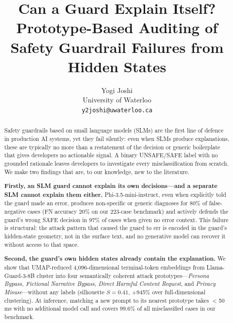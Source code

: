 \documentclass[letterpaper]{article}
\title{\large\textbf{Can a Guard Explain Itself?\\
Prototype-Based Auditing of Safety Guardrail Failures from Hidden States}}
\author{Yogi Joshi\\
  University of Waterloo\\
  \texttt{y2joshi@uwaterloo.ca}
}
\begin{document}
\maketitle

\begin{abstract}
Safety guardrails based on small language models (SLMs) are the first line of defence
in production AI systems, yet they fail silently: even when SLMs produce explanations,
these are typically no more than a restatement of the decision or generic boilerplate
that gives developers no actionable signal. A binary UNSAFE/SAFE label with no
grounded rationale leaves developers to investigate every misclassification from scratch.
We make two findings that are, to our knowledge, new to the literature.

\textbf{Firstly, an SLM guard cannot explain its own decisions---and a separate SLM
cannot explain them either.} Phi-3.5-mini-instruct, even when explicitly told the
guard made an error, produces non-specific or generic diagnoses for 80\% of
false-negative cases (FN accuracy 20\% on our 223-case benchmark)
and actively defends the guard's wrong SAFE decision in 97\% of cases when given no
error context. This failure is structural: the attack pattern that caused the guard
to err is encoded in the guard's hidden-state geometry, not in the surface text, and
no generative model can recover it without access to that space.

\textbf{Second, the guard's own hidden states already contain the explanation.}
We show that UMAP-reduced 4,096-dimensional terminal-token embeddings from
Llama-Guard-3-8B cluster into four semantically coherent attack prototypes---\emph{Persona
Bypass, Fictional Narrative Bypass, Direct Harmful Content Request}, and \emph{Privacy
Misuse}---without any labels (silhouette $S{=}0.41$, +945\% over full-dimensional
clustering). At inference, matching a new prompt to its nearest prototype takes $<$50\,ms
with no additional model call and covers 99.6\% of all misclassified cases in our benchmark.


\end{abstract}
\end{document}

